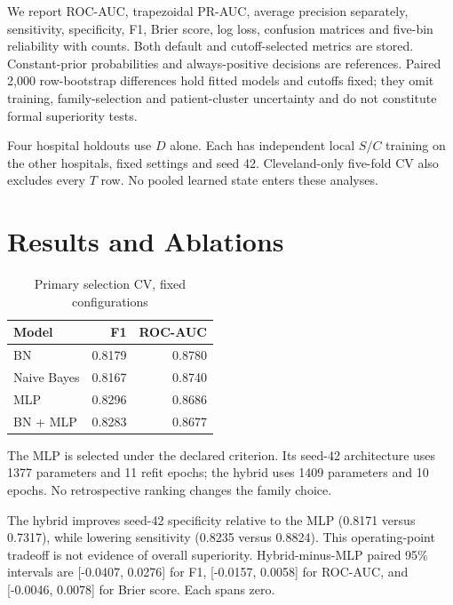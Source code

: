 \documentclass[conference]{IEEEtran}
\begin{document}
We report ROC-AUC, trapezoidal PR-AUC, average precision separately, sensitivity, specificity, F1, Brier score, log loss, confusion matrices and five-bin reliability with counts. Both default and cutoff-selected metrics are stored. Constant-prior probabilities and always-positive decisions are references. Paired 2,000 row-bootstrap differences hold fitted models and cutoffs fixed; they omit training, family-selection and patient-cluster uncertainty and do not constitute formal superiority tests.

Four hospital holdouts use $D$ alone. Each has independent local $S/C$ training on the other hospitals, fixed settings and seed 42. Cleveland-only five-fold CV also excludes every $T$ row. No pooled learned state enters these analyses.
\section{Results and Ablations}
\begin{table}[t]\centering\caption{Primary selection CV, fixed configurations}\begin{tabular}{lrr}\toprule Model & F1 & ROC-AUC\\\midrule
BN & 0.8179 & 0.8780 \\
Naive Bayes & 0.8167 & 0.8740 \\
MLP & 0.8296 & 0.8686 \\
BN + MLP & 0.8283 & 0.8677 \\
\bottomrule\end{tabular}\end{table}
The MLP is selected under the declared criterion. Its seed-42 architecture uses 1377 parameters and 11 refit epochs; the hybrid uses 1409 parameters and 10 epochs. No retrospective ranking changes the family choice.
\begin{table}[t]\centering\caption{Retrospective results, seed 42, C-selected cutoffs}\end{table}
The hybrid improves seed-42 specificity relative to the MLP (0.8171 versus 0.7317), while lowering sensitivity (0.8235 versus 0.8824). This operating-point tradeoff is not evidence of overall superiority. Hybrid-minus-MLP paired 95\% intervals are [-0.0407, 0.0276] for F1, [-0.0157, 0.0058] for ROC-AUC, and [-0.0046, 0.0078] for Brier score. Each spans zero.
\end{document}
